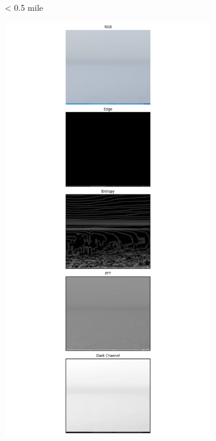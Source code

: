 \begin{figure}
\begin{subfigure}[b]{0.15\textwidth}
    \caption{< 0.5 mile}
    \label{subfig:bin0}
  \end{subfigure}
  \begin{subfigure}[b]{0.15\textwidth}
    \includegraphics[width=\textwidth, trim={7.5cm 0 7.5cm 0},clip]{imgs/examples/exp_0_featuresMiles_0.9320591049747102_featuresM_1500_features.png}

\end{subfigure}
\end{figure}
